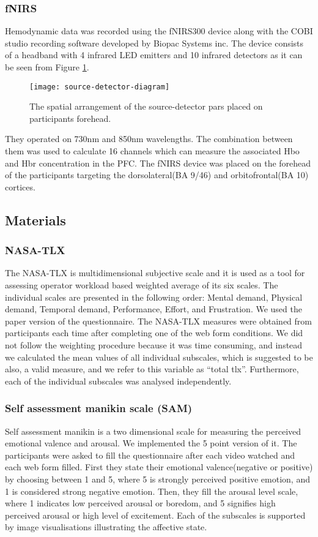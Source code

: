 \documentclass[../main/Feedback.tex]{subfiles}
\begin{document}
\subsubsection{fNIRS}
Hemodynamic data was recorded using the fNIRS300 device along with the COBI studio recording software developed by Biopac Systems inc. The device consists of a headband with 4 infrared LED emitters and 10 infrared detectors as it can be seen from Figure \ref{fig:source-detector-diagram}. 				
\begin{figure}[h]
	\centering
	\texttt{[image: source-detector-diagram]}
	\caption[fNIRS source-detector diagram]{The spatial arrangement of the source-detector pars placed on participants forehead.}
	\label{fig:source-detector-diagram}
\end{figure}
They operated on 730nm and 850nm wavelengths. The combination between them was used to calculate 16 channels which can measure the associated Hbo and Hbr concentration in the PFC. The fNIRS device was placed on the forehead of the participants targeting the dorsolateral(BA 9/46) and orbitofrontal(BA 10) cortices.
\subsection{Materials}
\subsubsection{NASA-TLX}
The NASA-TLX\cite{nasatlx} is multidimensional subjective scale and it is used as a tool for assessing operator workload based weighted average of its six scales. The individual scales are presented in the following order: Mental demand, Physical demand, Temporal demand, Performance, Effort, and Frustration. We used the paper version of the questionnaire. The NASA-TLX measures were obtained from participants each time after completing one of the web form conditions. We did not follow the weighting procedure because it was time consuming, and instead we calculated the mean values of all individual subscales, which is suggested to be also, a valid measure\cite{hart2006nasa}, and we refer to this variable as ``total tlx''. Furthermore, each of the individual subscales was analysed independently.
\subsubsection{Self assessment manikin scale (SAM)}
Self assessment manikin\cite{bradley1994measuring} is a two dimensional scale for measuring the perceived emotional valence and arousal. We implemented the 5 point version of it. The participants were asked to fill the questionnaire after each video watched and each web form filled. First they state their emotional valence(negative or positive) by choosing between 1 and 5, where 5 is strongly perceived positive emotion, and 1 is considered strong negative emotion. Then, they fill the arousal level scale, where 1 indicates low perceived arousal or boredom, and 5 signifies high perceived arousal or high level of excitement. Each of the subscales is supported by image visualisations illustrating the affective state.
\end{document}
